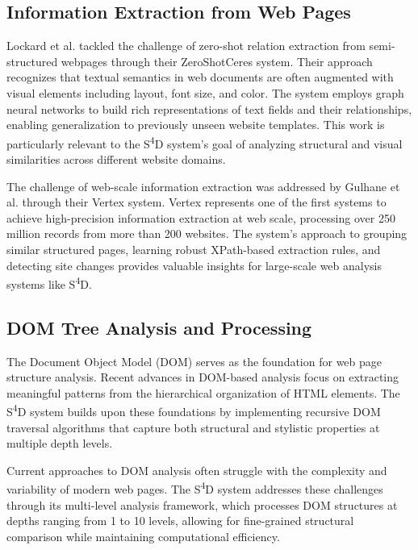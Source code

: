 \subsection{Information Extraction from Web Pages}

Lockard et al. \cite{lockard2020zeroshotceres} tackled the challenge of zero-shot relation extraction from semi-structured webpages through their ZeroShotCeres system. Their approach recognizes that textual semantics in web documents are often augmented with visual elements including layout, font size, and color. The system employs graph neural networks to build rich representations of text fields and their relationships, enabling generalization to previously unseen website templates. This work is particularly relevant to the S\textsuperscript{4}D system's goal of analyzing structural and visual similarities across different website domains.

The challenge of web-scale information extraction was addressed by Gulhane et al. \cite{gulhane2011vertex} through their Vertex system. Vertex represents one of the first systems to achieve high-precision information extraction at web scale, processing over 250 million records from more than 200 websites. The system's approach to grouping similar structured pages, learning robust XPath-based extraction rules, and detecting site changes provides valuable insights for large-scale web analysis systems like S\textsuperscript{4}D.

\subsection{DOM Tree Analysis and Processing}

The Document Object Model (DOM) serves as the foundation for web page structure analysis. Recent advances in DOM-based analysis focus on extracting meaningful patterns from the hierarchical organization of HTML elements. The S\textsuperscript{4}D system builds upon these foundations by implementing recursive DOM traversal algorithms that capture both structural and stylistic properties at multiple depth levels.

Current approaches to DOM analysis often struggle with the complexity and variability of modern web pages. The S\textsuperscript{4}D system addresses these challenges through its multi-level analysis framework, which processes DOM structures at depths ranging from 1 to 10 levels, allowing for fine-grained structural comparison while maintaining computational efficiency.


